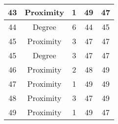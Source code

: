 \documentclass[results.tex]{subfiles}
\begin{document}
\begin{center}
\begin{tabular}{| c || c | c | c | c |}
    \hline
    43 & Proximity & 1 & 49 & 47 \\ 
    \hline
    44 & Degree & 6 & 44 & 45 \\ 
    \hline
    45 & Proximity & 3 & 47 & 47 \\ 
    \hline
    45 & Degree & 3 & 47 & 47 \\ 
    \hline
    46 & Proximity & 2 & 48 & 49 \\ 
    \hline
    47 & Proximity & 1 & 49 & 49 \\ 
    \hline
    48 & Proximity & 3 & 47 & 49 \\ 
    \hline
    49 & Proximity & 1 & 49 & 47 \\ 
    \hline   \end{tabular}
\end{center}
\end{document}
